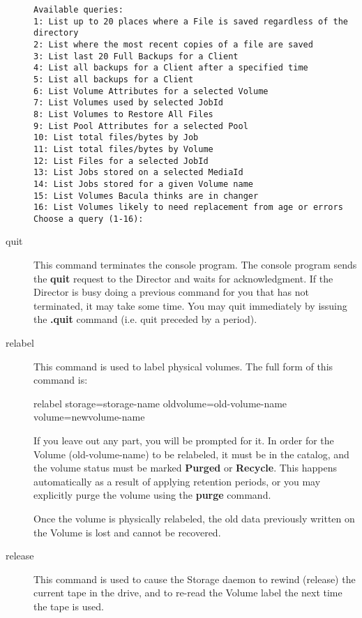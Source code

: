 \begin{description}
\footnotesize
\begin{verbatim}
Available queries:
1: List up to 20 places where a File is saved regardless of the directory
2: List where the most recent copies of a file are saved
3: List last 20 Full Backups for a Client
4: List all backups for a Client after a specified time
5: List all backups for a Client
6: List Volume Attributes for a selected Volume
7: List Volumes used by selected JobId
8: List Volumes to Restore All Files
9: List Pool Attributes for a selected Pool
10: List total files/bytes by Job
11: List total files/bytes by Volume
12: List Files for a selected JobId
13: List Jobs stored on a selected MediaId
14: List Jobs stored for a given Volume name
15: List Volumes Bacula thinks are in changer
16: List Volumes likely to need replacement from age or errors
Choose a query (1-16):
\end{verbatim}
\normalsize

\item [quit]
   This command terminates the console program. The  console program sends the
   {\bf quit} request to the Director  and waits for acknowledgment. If the
   Director is busy doing  a previous command for you that has not terminated, it
   may  take some time. You may quit immediately by issuing the  {\bf .quit}
   command (i.e. quit preceded by a period).  

\item [relabel]
   This command is used to label physical volumes.  The full form of this
   command is:

relabel storage=\lt{}storage-name\gt{} oldvolume=\lt{}old-volume-name\gt{}  
    volume=\lt{}newvolume-name\gt{} 
 
   If you leave out any part, you will be prompted for it.  In order for
   the Volume (old-volume-name) to be relabeled, it must be in the catalog,
   and the volume status must be marked {\bf Purged} or {\bf Recycle}.
   This happens automatically as a result of applying retention periods, or
   you may explicitly purge the volume using the {\bf purge} command.

   Once the volume is physically relabeled, the old data previously written
   on the Volume is lost and cannot be recovered.

\item [release]
   This command is used to cause the Storage daemon to rewind (release) the
   current tape in the drive, and to re-read the Volume label the next time
   the tape is used.


\end{description}
